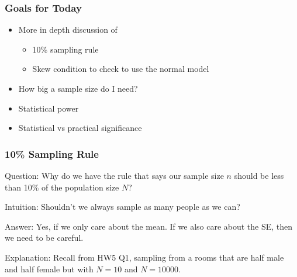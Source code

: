 \documentclass[handout]{beamer}
\newcommand{\blue}[1]{\textcolor{blue2}{#1}}
\begin{document}
\begin{frame}[fragile]
\frametitle{Goals for Today}

\begin{itemize}
\item More in depth discussion of 
\begin{itemize}
\item 10\% sampling rule
\item Skew condition to check to use the normal model
\end{itemize}
\item How big a sample size do I need?
\item Statistical power
\item Statistical vs practical significance
\end{itemize}

\end{frame}


\begin{frame}[fragile]
\frametitle{10\% Sampling Rule}

\blue{Question}: Why do we have the rule that says our sample size $n$ should be less than 10\% of the population size $N?$

\pause\vspace{0.5cm}

\blue{Intuition}: Shouldn't we always sample as many people as we can?

\pause\vspace{0.5cm}

\blue{Answer}: Yes, if we only care about the mean.  If we also care about the SE, then we need to be careful.  

\pause\vspace{0.5cm}

\blue{Explanation}:  Recall from HW5 Q1, sampling from a rooms that are half male and half female but with $N=10$ and $N=10000$.  

\end{frame}
\end{document}
